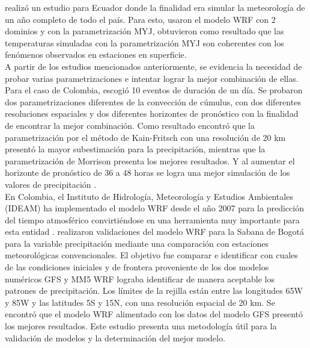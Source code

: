 \citet{Parra2012} realizó un estudio para Ecuador donde la finalidad era simular la meteorología de un año completo de todo el país. Para esto, usaron el modelo WRF con 2 dominios y con la parametrización MYJ, obtuvieron como resultado que las temperaturas simuladas con la parametrización MYJ son coherentes con los fenómenos observados en estaciones en superficie.\\


A partir de los estudios mencionados anteriormente, se evidencia la necesidad de probar varias parametrizaciones e intentar lograr la mejor combinación de ellas. Para el caso de Colombia, \citet{Uribe2012} escogió 10 eventos de duración de un día. Se probaron dos parametrizaciones diferentes de la convección de cúmulus, con dos diferentes resoluciones espaciales y dos diferentes horizontes de pronóstico con la finalidad de encontrar la mejor combinación. Como resultado encontró que la parametrización por el método de Kain-Fritsch \citep{JohnS2004} con una resolución de 20 km presentó la mayor subestimación para la precipitación, mientras que la parametrización de Morrison \citep{Morrison2009} presenta los mejores resultados. Y al aumentar el horizonte de pronóstico de 36 a 48 horas se logra una mejor simulación de los valores de precipitación \citep{Uribe2012}.\\

En Colombia, el Instituto de Hidrología, Meteorología y Estudios Ambientales (IDEAM) ha implementado el modelo WRF desde el año 2007 para la predicción del tiempo atmosférico convirtiéndose en una herramienta muy importante para esta entidad \citep{Arango2011}. \citet{Mejia2012} realizaron validaciones del modelo WRF para la Sabana de Bogotá para la variable precipitación mediante una comparación con estaciones meteorológicas convencionales. El objetivo fue comparar e identificar con cuales de las condiciones iniciales y de frontera proveniente de los dos modelos numéricos GFS \citep{NOAA2016} y MM5 WRF lograba identificar de manera aceptable los patrones de precipitación. Los límites de la rejilla están entre las longitudes 65\degree W y 85\degree W y las latitudes 5\degree S y 15\degree N, con una resolución espacial de 20 km. Se encontró que el modelo WRF alimentado con los datos del modelo GFS presentó los mejores resultados. Este estudio presenta una metodología útil para la validación de modelos y la determinación del mejor modelo.\\


